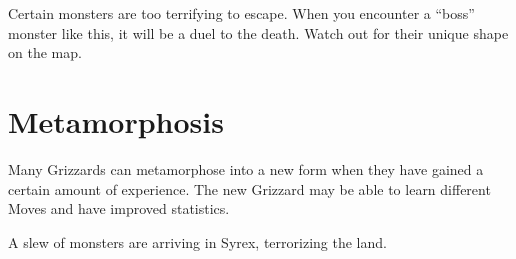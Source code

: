 \documentclass[10pt,twocolumn,openany,article]{memoir}
\begin{document}
Certain  monsters  are too  terrifying  to  escape. When  you  encounter
a ``boss'' monster like this, it will  be a duel to the death. Watch out
for their unique shape on the map.

\section{Metamorphosis}

Many Grizzards can meta\-morphose into a  new form when they have gained
a certain  amount of experience. The  new Grizzard may be  able to learn
different Moves and have improved statistics.


A slew of monsters are arriving in Syrex, terrorizing the land.
\end{document}
